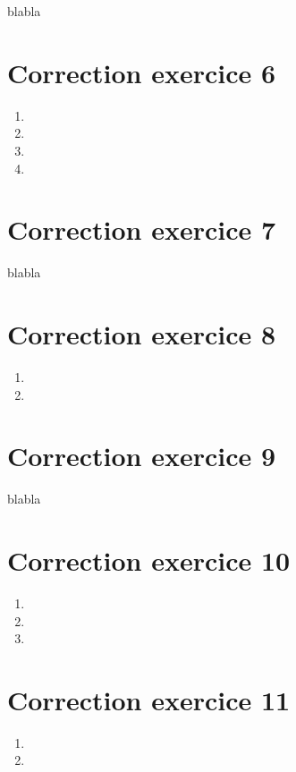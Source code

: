 \documentclass[a4paper, 11pt, titlepage]{article}
\begin{document}
blabla

\section{Correction exercice 6}
\begin{enumerate}[label=(\alph*)]
\item

\item 

\item 

\item 

\end{enumerate}

\section{Correction exercice 7}

blabla

\section{Correction exercice 8}
\begin{enumerate}[label=(\alph*)]
\item

\item 


\end{enumerate}

\section{Correction exercice 9}

blabla

\section{Correction exercice 10}
\begin{enumerate}[label=(\alph*)]
\item

\item 

\item 

\end{enumerate}

\section{Correction exercice 11}
\begin{enumerate}[label=(\alph*)]
\item

\item 


\end{enumerate}
\end{document}
